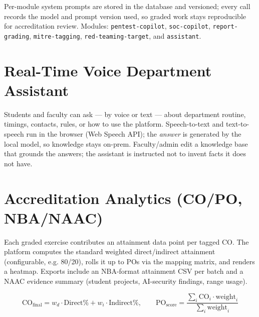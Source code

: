 \documentclass[11pt,a4paper]{article}
\begin{document}
Per-module system prompts are stored in the database and versioned; every call
records the model and prompt version used, so graded work stays reproducible for
accreditation review. Modules: \texttt{pentest-copilot}, \texttt{soc-copilot},
\texttt{report-grading}, \texttt{mitre-tagging}, \texttt{red-teaming-target}, and
\texttt{assistant}.

\section{Real-Time Voice Department Assistant}
Students and faculty can ask --- by voice or text --- about department routine,
timings, contacts, rules, or how to use the platform. Speech-to-text and
text-to-speech run in the browser (Web Speech API); the \emph{answer} is
generated by the local model, so knowledge stays on-prem. Faculty/admin edit a
knowledge base that grounds the answers; the assistant is instructed not to
invent facts it does not have.

\section{Accreditation Analytics (CO/PO, NBA/NAAC)}
Each graded exercise contributes an attainment data point per tagged CO. The
platform computes the standard weighted direct/indirect attainment
(configurable, e.g. 80/20), rolls it up to POs via the mapping matrix, and
renders a heatmap. Exports include an NBA-format attainment CSV per batch and a
NAAC evidence summary (student projects, AI-security findings, range usage).

\[
\text{CO}_{\text{final}} = w_d \cdot \text{Direct}\% + w_i \cdot \text{Indirect}\%,
\qquad
\text{PO}_{\text{score}} = \frac{\sum_i \text{CO}_i \cdot \text{weight}_i}{\sum_i \text{weight}_i}
\]

\end{document}
